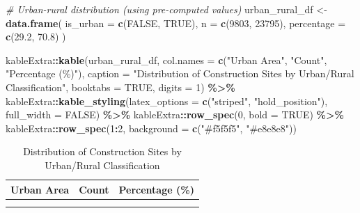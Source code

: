 \documentclass[
]{article}
\newenvironment{Shaded}{\begin{snugshade}}{\end{snugshade}}
\newcommand{\AttributeTok}[1]{\textcolor[rgb]{0.13,0.29,0.53}{#1}}
\newcommand{\CommentTok}[1]{\textcolor[rgb]{0.56,0.35,0.01}{\textit{#1}}}
\newcommand{\ConstantTok}[1]{\textcolor[rgb]{0.56,0.35,0.01}{#1}}
\newcommand{\DecValTok}[1]{\textcolor[rgb]{0.00,0.00,0.81}{#1}}
\newcommand{\FloatTok}[1]{\textcolor[rgb]{0.00,0.00,0.81}{#1}}
\newcommand{\FunctionTok}[1]{\textcolor[rgb]{0.13,0.29,0.53}{\textbf{#1}}}
\newcommand{\NormalTok}[1]{#1}
\newcommand{\OtherTok}[1]{\textcolor[rgb]{0.56,0.35,0.01}{#1}}
\newcommand{\SpecialCharTok}[1]{\textcolor[rgb]{0.81,0.36,0.00}{\textbf{#1}}}
\newcommand{\StringTok}[1]{\textcolor[rgb]{0.31,0.60,0.02}{#1}}
\begin{document}
\begin{Shaded}
\begin{Highlighting}[]
\CommentTok{\# Urban{-}rural distribution (using pre{-}computed values)}
\NormalTok{urban\_rural\_df }\OtherTok{\textless{}{-}} \FunctionTok{data.frame}\NormalTok{(}
  \AttributeTok{is\_urban =} \FunctionTok{c}\NormalTok{(}\ConstantTok{FALSE}\NormalTok{, }\ConstantTok{TRUE}\NormalTok{),}
  \AttributeTok{n =} \FunctionTok{c}\NormalTok{(}\DecValTok{9803}\NormalTok{, }\DecValTok{23795}\NormalTok{),}
  \AttributeTok{percentage =} \FunctionTok{c}\NormalTok{(}\FloatTok{29.2}\NormalTok{, }\FloatTok{70.8}\NormalTok{)}
\NormalTok{)}

\NormalTok{kableExtra}\SpecialCharTok{::}\FunctionTok{kable}\NormalTok{(urban\_rural\_df, }
                 \AttributeTok{col.names =} \FunctionTok{c}\NormalTok{(}\StringTok{"Urban Area"}\NormalTok{, }\StringTok{"Count"}\NormalTok{, }\StringTok{"Percentage (\%)"}\NormalTok{),}
                 \AttributeTok{caption =} \StringTok{"Distribution of Construction Sites by Urban/Rural Classification"}\NormalTok{,}
                 \AttributeTok{booktabs =} \ConstantTok{TRUE}\NormalTok{,}
                 \AttributeTok{digits =} \DecValTok{1}\NormalTok{) }\SpecialCharTok{\%\textgreater{}\%}
\NormalTok{  kableExtra}\SpecialCharTok{::}\FunctionTok{kable\_styling}\NormalTok{(}\AttributeTok{latex\_options =} \FunctionTok{c}\NormalTok{(}\StringTok{"striped"}\NormalTok{, }\StringTok{"hold\_position"}\NormalTok{),}
                           \AttributeTok{full\_width =} \ConstantTok{FALSE}\NormalTok{) }\SpecialCharTok{\%\textgreater{}\%}
\NormalTok{  kableExtra}\SpecialCharTok{::}\FunctionTok{row\_spec}\NormalTok{(}\DecValTok{0}\NormalTok{, }\AttributeTok{bold =} \ConstantTok{TRUE}\NormalTok{) }\SpecialCharTok{\%\textgreater{}\%}
\NormalTok{  kableExtra}\SpecialCharTok{::}\FunctionTok{row\_spec}\NormalTok{(}\DecValTok{1}\SpecialCharTok{:}\DecValTok{2}\NormalTok{, }\AttributeTok{background =} \FunctionTok{c}\NormalTok{(}\StringTok{"\#f5f5f5"}\NormalTok{, }\StringTok{"\#e8e8e8"}\NormalTok{))}
\end{Highlighting}
\end{Shaded}

\begin{longtable}[t]{lrr}
\caption{\label{tab:urban_rural_table}Distribution of Construction Sites by Urban/Rural Classification}\\
\toprule
\textbf{Urban Area} & \textbf{Count} & \textbf{Percentage (\%)}\\
\midrule
\cellcolor[HTML]{f5f5f5}{\cellcolor{gray!10}{FALSE}} & \cellcolor[HTML]{e8e8e8}{\cellcolor{gray!10}{9803}} & \cellcolor[HTML]{f5f5f5}{\cellcolor{gray!10}{29.2}}\\
\cellcolor[HTML]{f5f5f5}{TRUE} & \cellcolor[HTML]{e8e8e8}{23795} & \cellcolor[HTML]{f5f5f5}{70.8}\\
\bottomrule
\end{longtable}
\end{document}
